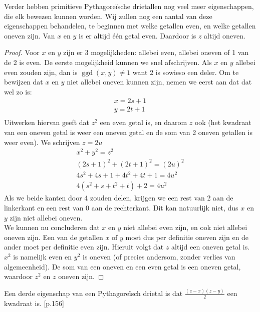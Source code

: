 \documentclass[12pt,reqno]{article}
\theoremstyle{theorem}
\theoremstyle{definition}
\DeclareMathOperator{\ggd}{ggd}
\begin{document}
	Verder hebben primitieve Pythagore\"ische drietallen nog veel meer eigenschappen, die elk bewezen kunnen worden. Wij zullen nog een aantal van deze eigenschappen behandelen, te beginnen met welke getallen even, en welke getallen oneven zijn. Van $x$ en $y$ is er altijd \'e\'en getal even. Daardoor is $z$ altijd oneven.
	\begin{proof}
	Voor $x$ en $y$ zijn er 3 mogelijkheden: allebei even, allebei oneven of 1 van de 2 is even. De eerste mogelijkheid kunnen we snel afschrijven. Als $x$ en $y$ allebei even zouden zijn, dan is $\ggd(x,y) \neq 1$ want 2 is sowieso een deler. Om te bewijzen dat $x$ en $y$ niet allebei oneven kunnen zijn, nemen we eerst aan dat dat wel zo is:
	\begin{align*}
	x = 2s + 1\\
	y = 2t + 1\\
	\end{align*}
	Uitwerken hiervan geeft dat $z^2$ een even getal is, en daarom $z$ ook (het kwadraat van een oneven getal is weer een oneven getal en de som van 2 oneven getallen is weer even). We schrijven $z = 2u$
	\begin{align*}
	x^2 + y^2 = z^2\\
	(2s + 1)^2 + (2t + 1)^2 = (2u)^2\\
	4s^2 + 4s + 1 +4t^2 + 4t + 1 = 4u^2\\
	4(s^2 + s + t^2 + t) + 2 = 4u^2
	\end{align*}
	Als we beide kanten door 4 zouden delen, krijgen we een rest van 2 aan de linkerkant en een rest van 0 aan de rechterkant. Dit kan natuurlijk niet, dus $x$ en $y$ zijn niet allebei oneven. \\
	We kunnen nu concluderen dat $x$ en $y$ niet allebei even zijn, en ook niet allebei oneven zijn. Een van de getallen $x$ of $y$ moet dus per definitie oneven zijn en de ander moet per definitie even zijn. Hieruit volgt dat $z$ altijd een oneven getal is. $x^2$ is namelijk even en $y^2$ is oneven (of precies andersom, zonder verlies van algemeenheid). De som van een oneven en een even getal is een oneven getal, waardoor $z^2$ en $z$ oneven zijn.
	\end{proof}
	Een derde eigenschap van een Pythagore\"isch drietal is dat $\frac{(z-x)(z-y)}{2}$ een kwadraat is. \cite{Posamentier}[p.156]
	
\end{document}
